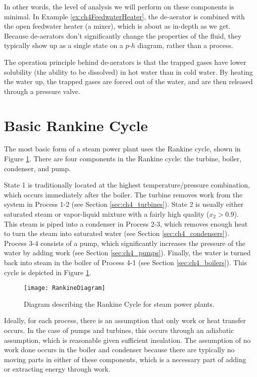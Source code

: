 In other words, the level of analysis we will perform on these components is minimal.  In Example \ref{ex:ch4FeedwaterHeater}, the de-aerator is combined with the open feedwater heater (a mixer), which is about as in-depth as we get.  Because de-aerators don't significantly change the properties of the fluid, they typically show up as a single state on a $p$-$h$ diagram, rather than a process.

The operation principle behind de-aerators is that the trapped gases have lower solubility (the ability to be dissolved) in hot water than in cold water.  By heating the water up, the trapped gases are forced out of the water, and are then released through a pressure valve.
%
\section{Basic Rankine Cycle} \label{sec:RankinePower}
The most basic form of a steam power plant uses the Rankine cycle, shown in Figure \ref{fig:ch4_RankineCycle}.  There are four components in the Rankine cycle: the turbine, boiler, condenser, and pump.

State 1 is traditionally located at the highest temperature/pressure combination, which occurs immediately after the boiler.  The turbine removes work from the system in Process 1-2 (see Section \ref{sec:ch4_turbines}).  State 2 is usually either saturated steam or vapor-liquid mixture with a fairly high quality ($x_2>0.9$).  This steam is piped into a condenser in Process 2-3, which removes enough heat to turn the steam into saturated water (see Section \ref{sec:ch4_condensers}).  Process 3-4 consists of a pump, which significantly increases the pressure of the water by adding work (see Section \ref{sec:ch4_pumps}).  Finally, the water is turned back into steam in the boiler of Process 4-1 (see Section \ref{sec:ch4_boilers}).  This cycle is depicted in Figure \ref{fig:ch4_RankineCycle}.

\begin{figure}[H]
\centering
\texttt{[image: RankineDiagram]}
\caption{Diagram describing the Rankine Cycle for steam power plants.}
\label{fig:ch4_RankineCycle}
\end{figure}

Ideally, for each process, there is an assumption that only work or heat transfer occurs.  In the case of pumps and turbines, this occurs through an adiabatic assumption, which is reasonable given sufficient insulation.  The assumption of no work done occurs in the boiler and condenser because there are typically no moving parts in either of these components, which is a necessary part of adding or extracting energy through work.

